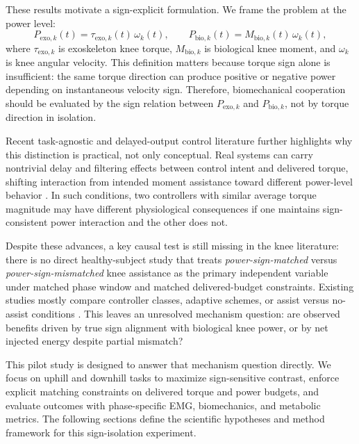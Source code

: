 \documentclass[lettersize,journal]{IEEEtran}
\begin{document}
These results motivate a sign-explicit formulation. We frame the problem at the power level:
\begin{equation}
P_{\mathrm{exo},k}(t)=\tau_{\mathrm{exo},k}(t)\,\omega_k(t), \qquad
P_{\mathrm{bio},k}(t)=M_{\mathrm{bio},k}(t)\,\omega_k(t),
\label{eq:power_defs_intro}
\end{equation}
where $\tau_{\mathrm{exo},k}$ is exoskeleton knee torque, $M_{\mathrm{bio},k}$ is biological knee moment, and $\omega_k$ is knee angular velocity. This definition matters because torque sign alone is insufficient: the same torque direction can produce positive or negative power depending on instantaneous velocity sign. Therefore, biomechanical cooperation should be evaluated by the sign relation between $P_{\mathrm{exo},k}$ and $P_{\mathrm{bio},k}$, not by torque direction in isolation.

Recent task-agnostic and delayed-output control literature further highlights why this distinction is practical, not only conceptual. Real systems can carry nontrivial delay and filtering effects between control intent and delivered torque, shifting interaction from intended moment assistance toward different power-level behavior \cite{lim2019tro,molinaro2024taskagnostic}. In such conditions, two controllers with similar average torque magnitude may have different physiological consequences if one maintains sign-consistent power interaction and the other does not.

Despite these advances, a key causal test is still missing in the knee literature: there is no direct healthy-subject study that treats \emph{power-sign-matched} versus \emph{power-sign-mismatched} knee assistance as the primary independent variable under matched phase window and matched delivered-budget constraints. Existing studies mostly compare controller classes, adaptive schemes, or assist versus no-assist conditions \cite{park2020hingefree,lee2023context,lee2018autonomous}. This leaves an unresolved mechanism question: are observed benefits driven by true sign alignment with biological knee power, or by net injected energy despite partial mismatch?

This pilot study is designed to answer that mechanism question directly. We focus on uphill and downhill tasks to maximize sign-sensitive contrast, enforce explicit matching constraints on delivered torque and power budgets, and evaluate outcomes with phase-specific EMG, biomechanics, and metabolic metrics. The following sections define the scientific hypotheses and method framework for this sign-isolation experiment.
\end{document}
